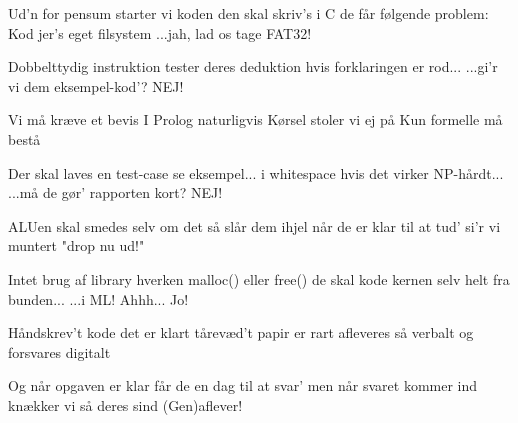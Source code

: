 \documentclass[a4paper,11pt]{article}
\begin{document}
\begin{song}


 Ud'n for pensum starter vi
koden den skal skriv's i C
 de får følgende problem:
Kod jer's eget filsystem
...jah, lad os tage FAT32!


 Dobbelttydig instruktion
tester deres deduktion
 hvis forklaringen er rod...
 ...gi'r vi dem eksempel-kod'?
 NEJ!

 Vi må kræve et bevis
I Prolog naturligvis
Kørsel stoler vi ej på
Kun formelle må bestå

 Der skal laves en test-case
se eksempel... i whitespace
 hvis det virker NP-hårdt...
 ...må de gør' rapporten kort?
 NEJ!

 ALUen skal smedes selv
om det så slår dem ihjel
når de er klar til at tud'
si'r vi muntert "drop nu ud!"

 Intet brug af library
hverken malloc() eller free()
de skal kode kernen selv
 helt fra bunden...
 ...i ML!
 Ahhh...
 Jo!


 Håndskrev't kode det er klart
tårevæd't papir er rart
afleveres så verbalt
og forsvares digitalt

 Og når opgaven er klar
får de en dag til at svar'
men når svaret kommer ind
knækker vi så deres sind
(Gen)aflever!

\end{song}
\end{document}

